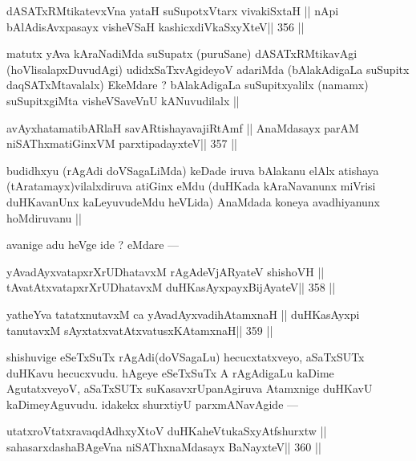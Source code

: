 \begin{shl}
dASATxRMtikatevxVna yataH suSupotxV\s tarx vivakiSxtaH ||
nApi bAlAdisAvxpasayx visheVSaH kashicxdiVkaSxyXteV\hfill || 356 ||
\end{shl}

\begin{artha}
matutx yAva kAraNadiMda suSupatx (puruSane) dASATxRMtikavAgi (hoVlisalapxDuvudAgi) udidxSaTxvAgideyoV adariMda (bAlakAdigaLa suSupitx daqSATxMtavalalx) EkeMdare ? bAlakAdigaLa suSupitxyalilx (namamx) suSupitxgiMta visheVSaveVnU kANuvudilalx ||
\end{artha}

\begin{shl}
avAyxhatamatibARlaH savARtishayavajiRtAmf ||
AnaMdasayx parAM niSAThxmatiGinxVM parxtipadayxteV\hfill || 357 ||
\end{shl}

\begin{artha}
budidhxyu (rAgAdi doVSagaLiMda) keDade iruva bAlakanu elAlx atishaya (tAratamayx)vilalxdiruva atiGinx eMdu (duHKada kAraNavanunx miVrisi duHKavanUnx kaLeyuvudeMdu heVLida) AnaMdada koneya avadhiyanunx hoMdiruvanu ||
\end{artha}

\begin{artha}
avanige adu heVge ide ? eMdare ---
\end{artha}

\begin{shl}
yAvadAyxvatapxrXrUDhatavxM rAgAdeVjARyateV shishoVH ||
tAvatAtxvatapxrXrUDhatavxM duHKasAyxpayxBijAyateV\hfill || 358 ||
\end{shl}

\begin{shl}
yatheYva tatatxnutavxM ca yAvadAyxvadihA\s\s tamxnaH ||
duHKasAyxpi tanutavxM sAyxtatxvatAtxvatusxKAtamxnaH\hfill || 359 ||
\end{shl}

\begin{artha}
shishuvige eSeTxSuTx rAgAdi(doVSagaLu) hecucxtatxveyo, aSaTxSUTx 
duHKavu hecucxvudu. hAgeye eSeTxSuTx A rAgAdigaLu kaDime AgutatxveyoV, 
aSaTxSUTx suKasavxrUpanAgiruva Atamxnige duHKavU kaDimeyAguvudu. idakekx shurxtiyU parxmANavAgide ---
\end{artha}

\begin{shl}
utatxroVtatxravaqdAdhxyX\s toV duHKaheVtukaSxyAtfshurxtw ||
\footnotemark[1]sahasarxdashaBAgeVna niSAThx\s\s naMdasayx BaNayxteV\hfill || 360 ||
\end{shl}

